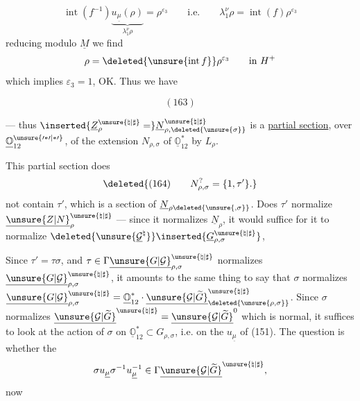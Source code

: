 \[
\operatorname{int}(f^{-1})\underbrace{u_{\underline\mu}(\rho)}_{\lambda_1^\nu\rho}
=\rho^{\varepsilon_3}\qquad\text{i.e.}\qquad
\lambda_1^\nu\rho=\operatorname{int}(f)\rho^{\varepsilon_3}
\]
reducing modulo $\underline M$ we find
\[
\rho=\deleted{\unsure{\operatorname{int}f}}\rho^{\varepsilon_3}\qquad\text{in }H^+
\]
which implies $\varepsilon_3=1$, OK. Thus we have
\begin{samepage}
\[
(163)
\]
\end{samepage}
--- thus $\inserted{\underline Z_\rho^{\unsure{\natural|\sharp}}=}\underline N_{\rho,\deleted{\unsure{\sigma}}}^{\unsure{\natural|\sharp}}$ is a \uline{partial section}, over $\underline{\mathbb O}_{12}^{\unsure{\prime*\prime|*\prime}}$, of the extension $N_{\rho,\sigma}$ of $\underline{\mathbb O}_{12}^{*}$ by $L_\rho$.

 This partial section does
\[
\deleted{(164)\qquad N_{\rho,\sigma}^{?}=\{1,\tau'\}.}
\]
not contain $\tau'$, which is a section of $\underline N_{\rho\deleted{\unsure{,\sigma}}}$. Does $\tau'$ normalize $\underline{\unsure{Z|N}}_\rho^{\unsure{\natural|\sharp}}$ --- since it normalizes $\underline N_\rho$, it would suffice for it to normalize
$\deleted{\unsure{\underline{\mathcal G}^{\natural}}}\inserted{\underline G_{\rho,\sigma}^{\unsure{\natural|\sharp}}}$,

Since $\tau'=\tau\sigma$,  and
$\tau\in\Gamma\underline{\unsure{G|\mathcal G}}_{\rho,\sigma}^{\unsure{\natural|\sharp}}$
normalizes $\underline{\unsure{G|\mathcal G}}_{\rho,\sigma}^{\unsure{\natural|\sharp}}$,
it amounts to the same thing to say that $\sigma$ normalizes
$\underline{\unsure{G|\mathcal G}}_{\rho,\sigma}^{\unsure{\natural|\sharp}}
=\underline{\mathbb O}_{12}^{*}\cdot\underline{\unsure{\mathcal G|\widetilde G}}^{\unsure{\natural|\sharp}}_{\deleted{\unsure{\rho,\sigma}}}$.
Since $\sigma$ normalizes $\underline{\unsure{\mathcal G|\widetilde G}}^{\unsure{\natural|\sharp}}=\underline{\unsure{\mathcal G|\widetilde G}}^0$ which is normal, it suffices to look at the action of $\sigma$ on $\underline{\mathbb O}_{12}^{*}\subset G_{\rho,\sigma}$,  i.e. on the $u_{\underline\mu}$ of (151). The question is whether the
\[
\sigma u_{\underline\mu}\sigma^{-1}u_{\underline\mu}^{-1}\in\Gamma\underline{\unsure{\mathcal G|\widetilde G}}^{\unsure{\natural|\sharp}},
\]
now

